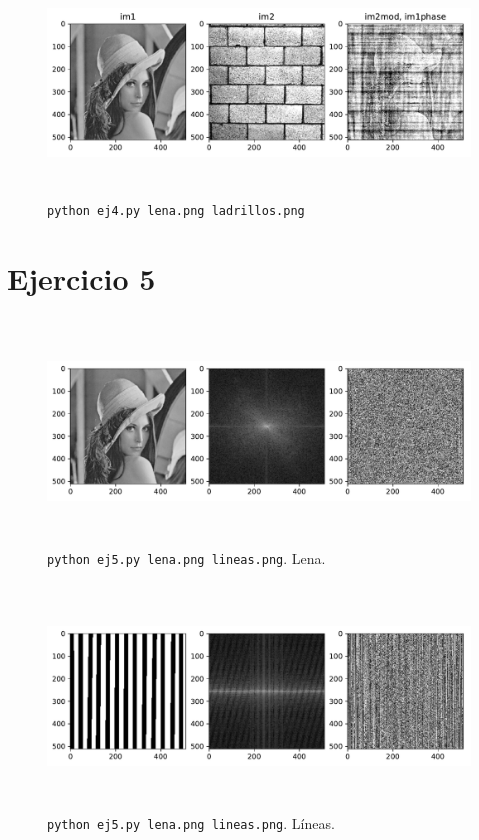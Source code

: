 \documentclass[11pt, spanish]{article}
\begin{document}
\begin{figure}[H]
\centering
  \includegraphics[height=6cm]{informe-imgs/ej4-b.pdf}
  \caption{\texttt{python ej4.py lena.png ladrillos.png}}
\end{figure}



\newpage
\section{Ejercicio 5}


\begin{figure}[H]
\centering
  \includegraphics[height=6cm]{informe-imgs/ej5-lena.pdf}
  \caption{\texttt{python ej5.py lena.png lineas.png}. Lena.}
\end{figure}

\begin{figure}[H]
\centering
  \includegraphics[height=6cm]{informe-imgs/ej5-lineas.pdf}
  \caption{\texttt{python ej5.py lena.png lineas.png}. Líneas.}
\end{figure}
\end{document}
